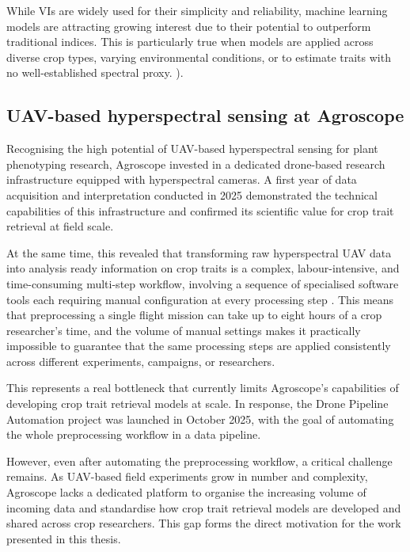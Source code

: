While VIs are widely used for their simplicity and reliability, machine learning models are attracting growing interest due to their potential to outperform traditional indices. This is particularly true when models are applied across diverse crop types, varying environmental conditions, or to estimate traits with no well-established spectral proxy. \parencite{kumar_remote_2017}).


\subsection{UAV-based hyperspectral sensing at Agroscope}
Recognising the high potential of UAV-based hyperspectral sensing for plant phenotyping research, Agroscope invested in a dedicated drone-based research infrastructure \parencite{noauthor_drone-based_nodate} equipped with hyperspectral cameras. A first year of data acquisition and interpretation \parencite{schneider_retrieval_2026} conducted in 2025 demonstrated the technical capabilities of this infrastructure and confirmed its scientific value for crop trait retrieval at field scale.

At the same time, this revealed that transforming raw hyperspectral UAV data into analysis ready information on  crop traits is a complex, labour-intensive, and time-consuming multi-step workflow, involving a sequence of specialised software tools each requiring manual configuration at every processing step \parencite{schneider_retrieval_2026}. This means that preprocessing a single flight mission can take up to eight hours of a crop researcher's time, and the volume of manual settings makes it practically impossible to guarantee that the same processing steps are applied consistently across different experiments, campaigns, or researchers.

This represents a real bottleneck that currently limits Agroscope's capabilities of developing crop trait retrieval models at scale. In response, the Drone Pipeline Automation project \parencite{noauthor_eoa-team026_dpa_2026} was launched in October 2025, with the goal of automating the whole preprocessing workflow in a data pipeline. 

However, even after automating the preprocessing workflow, a critical challenge remains. As UAV-based field experiments grow in number and complexity, Agroscope lacks a dedicated platform to organise the increasing volume of incoming data and standardise how crop trait retrieval models are developed and shared across crop researchers. This gap forms the direct motivation for the work presented in this thesis.




